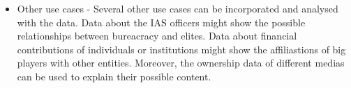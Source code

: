 \begin{itemize}
\item Other use cases - Several other use cases can be incorporated and analysed with the data. Data about the IAS officers might show the possible relationships between bureacracy and elites. Data about financial contributions of individuals or institutions might show the affiliastions of big players with other entities. Moreover, the ownership data of different medias can be used to explain their possible content.

\end{itemize}
